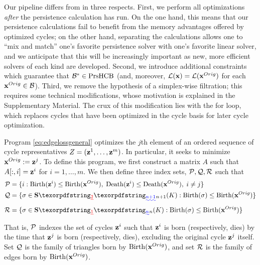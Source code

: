 Our pipeline differs from \cite{Escolar2016} in three respects.  First, we perform all optimizations \emph{after} the persistence calculation has run.   On the one hand, this means that our persistence calculations  fail to  benefit from the memory advantages offered by optimized cycles; on the other hand, separating the calculations allows one to ``mix and match'' one's favorite persistence solver with one's favorite linear solver, and we anticipate that this will be increasingly important as new, more efficient solvers of each kind are developed.  Second, we introduce additional constraints which guarantee that $\mathcal B^* \in \mathrm{PrsHCB}$  
(and, moreover, $\mathcal{L}( \mathbf{x}) = \mathcal{L}( \mathbf{x}^{Orig})$ for each $\mathbf{x}^{Orig} \in \mathcal B$). Third, we remove the hypothesis of a simplex-wise filtration; this requires some technical modifications, whose motivation is explained in the Supplementary Material. The crux of this modification lies with the for loop, which replaces cycles that have been optimized in the cycle basis for later cycle optimization.

Program \eqref{eq:edgelossgeneral} optimizes the $j$th element of an ordered sequence of cycle representatives $Z = (\mathbf{z}^1, \ldots, \mathbf{z}^m)$.  In particular, it seeks to minimize $\mathbf{x}^{Orig} := {\mathbf z}^j$.  To define this program, we first construct a matrix $A$ such that $A[:, i] = {\mathbf z}^i$ for $i = 1, \ldots, m$.  We then define  three index sets, $\mathcal P, \mathcal Q, \mathcal R$ such that 
    \begin{align*}
        \goodcycleindices &= \{ i :  \birth(\cycle^i) \le \birth(\originalrep), \;  \death(\cycle^i) \le \death(\originalrep), \; i \neq j \} \\
        \goodtriangles &= \{\sigma \in \Simplices\DIFdelbegin \DIFdel{_2}\DIFdelend \DIFaddbegin \DIFadd{_{n+1}}\DIFaddend (K) : \birth(\sigma) \le \birth(\originalrep)\} 
        \\
        \goodedges &= \{\sigma \in \Simplices\DIFdelbegin \DIFdel{_1}\DIFdelend \DIFaddbegin \DIFadd{_n}\DIFaddend (K) : \birth(\sigma) \le \birth(\originalrep)\}
    \end{align*} 
That is, $\mathcal P$ indexes the set of cycles ${\mathbf z}^i$ such that ${\mathbf z}^i$ is born  (respectively, dies) by the time that ${\mathbf z}^j$ is born (respectively, dies),  excluding the original cycle ${\mathbf z}^j$ itself. Set $\mathcal Q$ is the family of triangles born by $\mathrm{Birth}(\mathbf{x}^{Orig})$, and set $\mathcal R$ is the family of edges born by $\mathrm{Birth}(\mathbf{x}^{Orig})$. 

